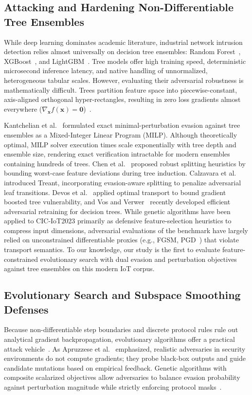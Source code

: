 \documentclass[iicol,pdflatex,sn-mathphys-num]{sn-jnl}
\begin{document}
\subsection{Attacking and Hardening Non-Differentiable Tree Ensembles}
\label{sec:rel_trees}
While deep learning dominates academic literature, industrial network intrusion detection relies almost universally on decision tree ensembles: Random Forest~\cite{breiman2001random}, XGBoost~\cite{chen2016xgboost}, and LightGBM~\cite{ke2017lightgbm}. Tree models offer high training speed, deterministic microsecond inference latency, and native handling of unnormalized, heterogeneous tabular scales. However, evaluating their adversarial robustness is mathematically difficult. Trees partition feature space into piecewise-constant, axis-aligned orthogonal hyper-rectangles, resulting in zero loss gradients almost everywhere ($\nabla_{\mathbf{x}} f(\mathbf{x}) = \mathbf{0}$)~\cite{kantchelian2016evasion}.

Kantchelian et al.~\cite{kantchelian2016evasion} formulated exact minimal-perturbation evasion against tree ensembles as a Mixed-Integer Linear Program (MILP). Although theoretically optimal, MILP solver execution times scale exponentially with tree depth and ensemble size, rendering exact verification intractable for modern ensembles containing hundreds of trees. Chen et al.~\cite{chen2019robust} proposed robust splitting heuristics by bounding worst-case feature deviations during tree induction. Calzavara et al.~\cite{calzavara2020treant} introduced Treant, incorporating evasion-aware splitting to penalize adversarial leaf transitions. Devos et al.~\cite{devos2023adversarial} applied optimal transport to bound gradient boosted tree vulnerability, and Vos and Verwer~\cite{vos2024adversarial} recently developed efficient adversarial retraining for decision trees. While genetic algorithms have been applied to CIC-IoT2023 primarily as defensive feature-selection heuristics to compress input dimensions, adversarial evaluations of the benchmark have largely relied on unconstrained differentiable proxies (e.g., FGSM, PGD~\cite{alhaija2024adversarial}) that violate transport semantics. To our knowledge, our study is the first to evaluate feature-constrained evolutionary search with dual evasion and perturbation objectives against tree ensembles on this modern IoT corpus.

\subsection{Evolutionary Search and Subspace Smoothing Defenses}
\label{sec:rel_evolutionary}
Because non-differentiable step boundaries and discrete protocol rules rule out analytical gradient backpropagation, evolutionary algorithms offer a practical attack vehicle~\cite{deb2002nsga}. As Apruzzese et al.~\cite{apruzzese2023real} emphasized, realistic adversaries in security environments do not compute gradients; they probe black-box outputs and guide candidate mutations based on empirical feedback. Genetic algorithms with composite scalarized objectives allow adversaries to balance evasion probability against perturbation magnitude while strictly enforcing protocol masks~\cite{alhajjar2021adversarial}.
\end{document}
